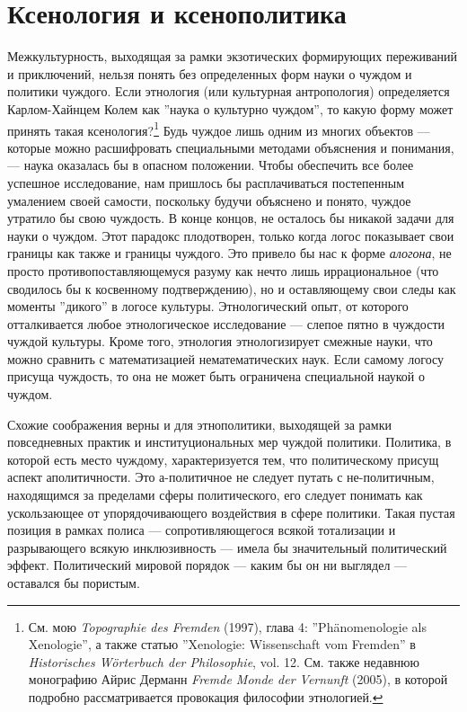 \documentclass[12pt]{book}
\begin{document}
\section{Ксенология и ксенополитика}

Межкультурность, выходящая за рамки экзотических формирующих переживаний и приключений, нельзя понять без определенных форм науки о чуждом и политики чуждого. Если этнология (или культурная антропология) определяется Карлом-Хайнцем Колем как ''наука о культурно чуждом'', то какую форму может принять такая ксенология?\footnote{См. мою \textit{Topographie des Fremden} (1997), глава 4: ''Phänomenologie als Xenologie'', а также статью ''Xenologie: Wissenschaft vom Fremden'' в \textit{Historisches Wörterbuch der Philosophie}, vol. 12. См. также недавнюю монографию Айрис Дерманн \textit{Fremde Monde der Vernunft} (2005), в которой подробно рассматривается провокация философии этнологией.} Будь чуждое лишь одним из многих объектов --- которые можно расшифровать специальными методами объяснения и понимания,--- наука оказалась бы в опасном положении. Чтобы обеспечить все более успешное исследование, нам пришлось бы расплачиваться постепенным умалением своей самости, поскольку будучи объяснено и понято, чуждое утратило бы свою чуждость. В конце концов, не осталось бы никакой задачи для науки о чуждом. Этот парадокс плодотворен, только когда логос показывает свои границы как также и границы чуждого. Это привело бы нас к форме \textit{алогона}, не просто противопоставляющемуся разуму как нечто лишь иррациональное (что сводилось бы к косвенному подтверждению), но и оставляющему свои следы как моменты ''дикого'' в логосе культуры. Этнологический опыт, от которого отталкивается любое этнологическое исследование --- слепое пятно в чуждости чуждой культуры. Кроме того, этнология этнологизирует смежные науки, что можно сравнить с математизацией нематематических наук. Если самому логосу присуща чуждость, то она не может быть ограничена специальной наукой о чуждом.

Схожие соображения верны и для этнополитики, выходящей за рамки повседневных практик и институциональных мер чуждой политики. Политика, в которой есть место чуждому, характеризуется тем, что политическому присущ аспект аполитичности. Это а-политичное не следует путать с не-политичным, находящимся за пределами сферы политического, его следует понимать как ускользающее от упорядочивающего воздействия в сфере политики. Такая пустая позиция в рамках полиса --- сопротивляющегося всякой тотализации и разрывающего всякую инклюзивность --- имела бы значительный политический эффект. Политический мировой порядок --- каким бы он ни выглядел --- оставался бы пористым.
\end{document}
